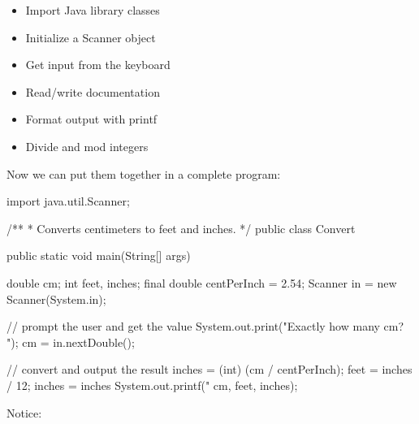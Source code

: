 \begin{itemize}



\item Import Java library classes
\item Initialize a Scanner object
\item Get input from the keyboard
\item Read/write documentation
\item Format output with printf
\item Divide and mod integers

\end{itemize}

Now we can put them together in a complete program:

\begin{code}
import java.util.Scanner;

/**
 * Converts centimeters to feet and inches.
 */
public class Convert {
    public static void main(String[] args) {
        double cm;
        int feet, inches;
        final double centPerInch = 2.54;
        Scanner in = new Scanner(System.in);

        // prompt the user and get the value
        System.out.print("Exactly how many cm? ");
        cm = in.nextDouble();

        // convert and output the result
        inches = (int) (cm / centPerInch);
        feet = inches / 12;
        inches = inches %
        System.out.printf("%
                          cm, feet, inches);
    }
}
\end{code}

Notice:

